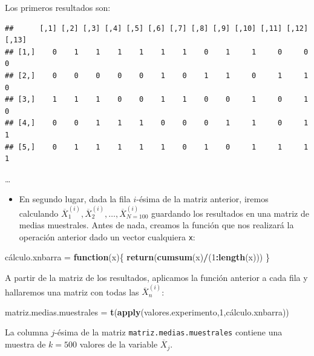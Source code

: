 \documentclass[]{book}
\newenvironment{Shaded}{\begin{snugshade}}{\end{snugshade}}
\newcommand{\ControlFlowTok}[1]{\textcolor[rgb]{0.13,0.29,0.53}{\textbf{#1}}}
\newcommand{\DecValTok}[1]{\textcolor[rgb]{0.00,0.00,0.81}{#1}}
\newcommand{\KeywordTok}[1]{\textcolor[rgb]{0.13,0.29,0.53}{\textbf{#1}}}
\newcommand{\NormalTok}[1]{#1}
\newcommand{\OperatorTok}[1]{\textcolor[rgb]{0.81,0.36,0.00}{\textbf{#1}}}
\newcommand{\StringTok}[1]{\textcolor[rgb]{0.31,0.60,0.02}{#1}}
\providecommand{\tightlist}{%
  \setlength{\itemsep}{0pt}\setlength{\parskip}{0pt}}
\begin{document}
Los primeros resultados son:

\begin{verbatim}
##      [,1] [,2] [,3] [,4] [,5] [,6] [,7] [,8] [,9] [,10] [,11] [,12] [,13]
## [1,]    0    1    1    1    1    1    1    0    1     1     0     0     0
## [2,]    0    0    0    0    0    1    0    1    1     0     1     1     0
## [3,]    1    1    1    0    0    1    1    0    0     1     0     1     0
## [4,]    0    0    1    1    1    0    0    0    1     1     0     1     1
## [5,]    0    1    1    1    1    1    0    1    0     1     1     1     1
\end{verbatim}

\ldots{}

\begin{itemize}
\tightlist
\item
  En segundo lugar, dada la fila \(i\)-ésima de la matriz anterior, iremos calculando \(\overline{X}_1^{(i)},\overline{X}_2^{(i)},\ldots,\overline{X}_{N=100}^{(i)}\) guardando los resultados en una matriz de medias muestrales.
  Antes de nada, creamos la función que nos realizará la operación anterior dado un vector cualquiera \texttt{x}:
\end{itemize}

\begin{Shaded}
\begin{Highlighting}[]
\NormalTok{cálculo.xnbarra =}\StringTok{ }\ControlFlowTok{function}\NormalTok{(x)\{}
  \KeywordTok{return}\NormalTok{(}\KeywordTok{cumsum}\NormalTok{(x)}\OperatorTok{/}\NormalTok{(}\DecValTok{1}\OperatorTok{:}\KeywordTok{length}\NormalTok{(x)))}
\NormalTok{\}}
\end{Highlighting}
\end{Shaded}

A partir de la matriz de los resultados, aplicamos la función anterior a cada fila y hallaremos una matriz con todas las \(\overline{X}_n^{(i)}\):

\begin{Shaded}
\begin{Highlighting}[]
\NormalTok{matriz.medias.muestrales =}\StringTok{ }\KeywordTok{t}\NormalTok{(}\KeywordTok{apply}\NormalTok{(valores.experimento,}\DecValTok{1}\NormalTok{,cálculo.xnbarra))}
\end{Highlighting}
\end{Shaded}

La columna \(j\)-ésima de la matriz \texttt{matriz.medias.muestrales} contiene una muestra de \(k=500\) valores de la variable \(\overline{X}_j\).
\end{document}
